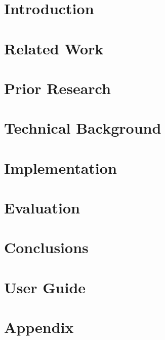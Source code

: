 



\listoftodos



\pagebreak

\chapter{Introduction}



\chapter{Related Work}


\chapter{Prior Research}

\label{sec:prior-research}

% 

\chapter{Technical Background}


\chapter{Implementation}


\chapter{Evaluation}


\chapter{Conclusions}


\chapter{User Guide}


\printbibliography

\appendix
\chapter{Appendix}



\printglossary[type=\acronymtype] %
\printglossary


